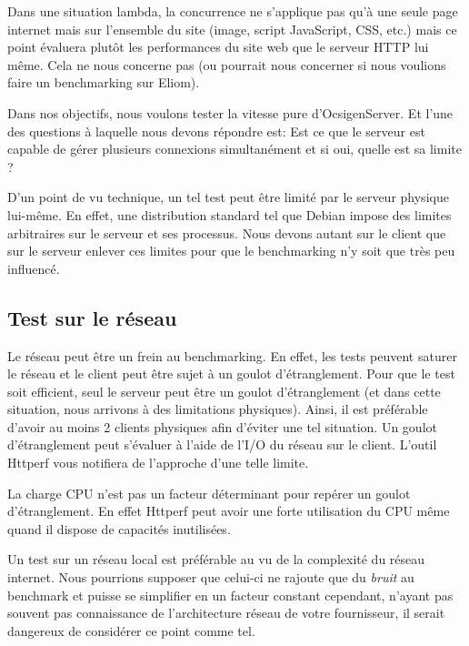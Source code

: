 \documentclass[a4paper, 11pt]{article}
\begin{document}
Dans une situation lambda,  la concurrence ne s'applique pas qu'à une seule page
internet mais sur l'ensemble du site (image, script JavaScript,  CSS, etc.) mais
ce point évaluera  plutôt les performances du  site web que le  serveur HTTP lui
même.  Cela ne  nous concerne pas (ou  pourrait nous concerner  si nous voulions
faire un benchmarking sur Eliom).

Dans nos  objectifs,  nous voulons tester  la vitesse  pure d'OcsigenServer.  Et
l'une des questions à laquelle  nous devons répondre est:  \guillemotleft Est ce
que le  serveur est capable de  gérer plusieurs  connexions simultanément  et si
oui, quelle est sa limite ?\guillemotright

D'un  point de  vu technique,  un  tel test  peut  être  limité  par  le serveur
physique lui-même.  En  effet,  une distribution standard tel  que Debian impose
des limites arbitraires sur le serveur et ses processus.  Nous devons autant sur
le client que  sur le serveur enlever  ces limites pour que  le benchmarking n'y
soit que très peu influencé.

\subsection{Test sur le réseau}

Le  réseau peut  être un  frein au  benchmarking.  En effet,  les  tests peuvent
saturer le réseau et le client peut être sujet à un goulot d'étranglement.  Pour
que le test soit efficient,  seul le  serveur peut être un goulot d'étranglement
(et dans cette situation, nous arrivons à des limitations physiques).  Ainsi, il
est préférable d'avoir  au  moins  2  clients  physiques  afin  d'éviter une tel
situation.  Un goulot d'étranglement peut s'évaluer  à l'aide de l'I/O du réseau
sur le client. L'outil Httperf vous notifiera de l'approche d'une telle limite.

La  charge  CPU  n'est  pas  un  facteur  déterminant  pour  repérer  un  goulot
d'étranglement.  En effet Httperf  peut avoir une forte utilisation  du CPU même
quand il dispose de capacités inutilisées.

Un test  sur un réseau local  est préférable au  vu de  la complexité  du réseau
internet.  Nous pourrions supposer que celui-ci ne rajoute que du \textsl{bruit}
au benchmark et puisse se  simplifier en un facteur constant cependant,  n'ayant
pas souvent pas connaissance de  l'architecture réseau de votre fournisseur,  il
serait dangereux de considérer ce point comme tel.
\end{document}
